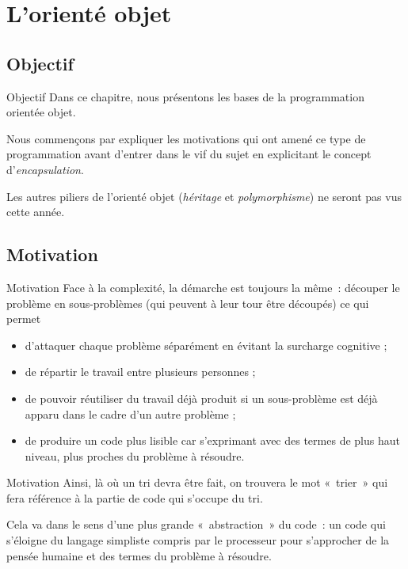 \section{L'orienté objet}

\subsection{Objectif}

\begin{frame}{Objectif}
	Dans ce chapitre, nous présentons les bases de la programmation orientée
	objet. 
	
	Nous commençons par expliquer les motivations qui ont amené ce
	type de programmation avant d'entrer dans le vif du
	sujet en explicitant le concept
	d'\textit{encapsulation}. 
	
	Les autres piliers de
	l'orienté objet (\textit{héritage} et
	\textit{polymorphisme}) ne seront pas vus cette année.
\end{frame}

\subsection{Motivation}

\begin{frame}{Motivation}
	Face à la complexité, la démarche est toujours la même~: découper le
	problème en sous-problèmes (qui peuvent à leur tour être découpés) ce
	qui permet

	\begin{itemize}
		\item 
			d'attaquer chaque problème séparément en évitant la
			surcharge cognitive ;
		\item 
			de répartir le travail entre plusieurs personnes ;
		\item 
			de pouvoir réutiliser du travail déjà produit si un sous-problème est
			déjà apparu dans le cadre d'un autre problème ;
		\item 
			de produire un code plus lisible car s'exprimant avec
			des termes de plus haut niveau, 
			plus proches du problème à résoudre.
		\end{itemize}
	\end{frame}

\begin{frame}{Motivation}
			Ainsi, là où un tri devra être fait, 
			on trouvera le mot «~trier~» qui fera référence 
			à la partie de code qui s’occupe du tri. 
			
			Cela va dans le sens d’une plus grande «~abstraction~» du code~: 
			un code qui s’éloigne du langage simpliste 
			compris par le processeur pour s’approcher de la
			pensée humaine et des termes du problème à résoudre.
\end{frame}

